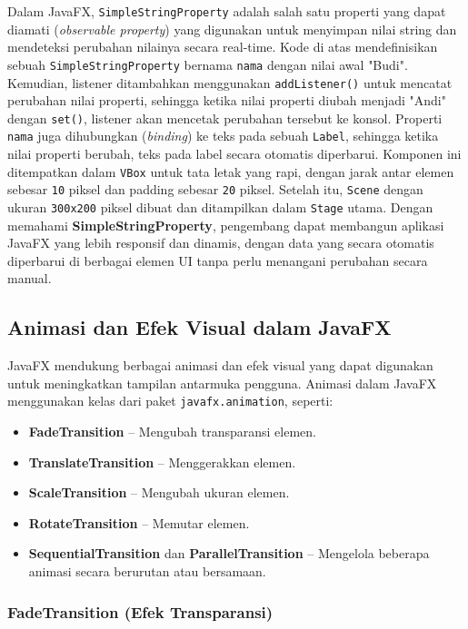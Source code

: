 Dalam JavaFX, \texttt{SimpleStringProperty} adalah salah satu properti yang dapat diamati (\textit{observable property}) yang digunakan untuk menyimpan nilai string dan mendeteksi perubahan nilainya secara real-time. Kode di atas mendefinisikan sebuah \texttt{SimpleStringProperty} bernama \texttt{nama} dengan nilai awal "Budi". Kemudian, listener ditambahkan menggunakan \texttt{addListener()} untuk mencatat perubahan nilai properti, sehingga ketika nilai properti diubah menjadi "Andi" dengan \texttt{set()}, listener akan mencetak perubahan tersebut ke konsol. Properti \texttt{nama} juga dihubungkan (\textit{binding}) ke teks pada sebuah \texttt{Label}, sehingga ketika nilai properti berubah, teks pada label secara otomatis diperbarui. Komponen ini ditempatkan dalam \texttt{VBox} untuk tata letak yang rapi, dengan jarak antar elemen sebesar \texttt{10} piksel dan padding sebesar \texttt{20} piksel. Setelah itu, \texttt{Scene} dengan ukuran \texttt{300x200} piksel dibuat dan ditampilkan dalam \texttt{Stage} utama. Dengan memahami \textbf{SimpleStringProperty}, pengembang dapat membangun aplikasi JavaFX yang lebih responsif dan dinamis, dengan data yang secara otomatis diperbarui di berbagai elemen UI tanpa perlu menangani perubahan secara manual.


\subsection{Animasi dan Efek Visual dalam JavaFX}

JavaFX mendukung berbagai animasi dan efek visual yang dapat digunakan untuk meningkatkan tampilan antarmuka pengguna. Animasi dalam JavaFX menggunakan kelas dari paket \texttt{javafx.animation}, seperti:

\begin{itemize}
\item \textbf{FadeTransition} – Mengubah transparansi elemen.
\item \textbf{TranslateTransition} – Menggerakkan elemen.
\item \textbf{ScaleTransition} – Mengubah ukuran elemen.
\item \textbf{RotateTransition} – Memutar elemen.
\item \textbf{SequentialTransition} dan \textbf{ParallelTransition} – Mengelola beberapa animasi secara berurutan atau bersamaan.
\end{itemize}

\subsubsection{FadeTransition (Efek Transparansi)}

